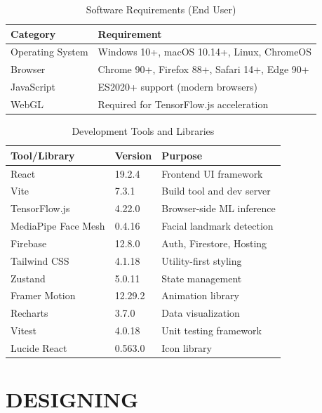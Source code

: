 \documentclass[12pt,letterpaper]{article}
\begin{document}
\begin{table}[H]
\centering
\begin{tabular}{|l|l|}
\hline
\textbf{Category} & \textbf{Requirement} \\
\hline
Operating System & Windows 10+, macOS 10.14+, Linux, ChromeOS \\
\hline
Browser & Chrome 90+, Firefox 88+, Safari 14+, Edge 90+ \\
\hline
JavaScript & ES2020+ support (modern browsers) \\
\hline
WebGL & Required for TensorFlow.js acceleration \\
\hline
\end{tabular}
\caption{Software Requirements (End User)}
\end{table}

\begin{table}[H]
\centering
\begin{tabular}{|l|l|l|}
\hline
\textbf{Tool/Library} & \textbf{Version} & \textbf{Purpose} \\
\hline
React & 19.2.4 & Frontend UI framework \\
\hline
Vite & 7.3.1 & Build tool and dev server \\
\hline
TensorFlow.js & 4.22.0 & Browser-side ML inference \\
\hline
MediaPipe Face Mesh & 0.4.16 & Facial landmark detection \\
\hline
Firebase & 12.8.0 & Auth, Firestore, Hosting \\
\hline
Tailwind CSS & 4.1.18 & Utility-first styling \\
\hline
Zustand & 5.0.11 & State management \\
\hline
Framer Motion & 12.29.2 & Animation library \\
\hline
Recharts & 3.7.0 & Data visualization \\
\hline
Vitest & 4.0.18 & Unit testing framework \\
\hline
Lucide React & 0.563.0 & Icon library \\
\hline
\end{tabular}
\caption{Development Tools and Libraries}
\end{table}

\newpage


\section{DESIGNING}
\end{document}
